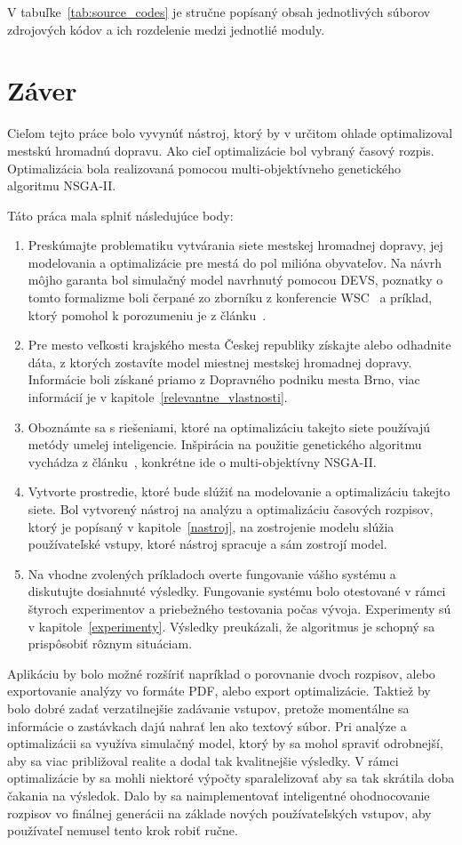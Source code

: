 V tabuľke~\ref{tab:source_codes} je stručne popísaný obsah jednotlivých súborov zdrojových kódov a ich rozdelenie medzi jednotlié moduly.

\chapter{Záver}\label{zaver}

Cieľom tejto práce bolo vyvynúť nástroj, ktorý by v určitom ohlade optimalizoval mestskú hromadnú dopravu.
Ako cieľ optimalizácie bol vybraný časový rozpis.
Optimalizácia bola realizovaná pomocou multi-objektívneho genetického algoritmu NSGA-II.

Táto práca mala splniť následujúce body:
\begin{enumerate}
  \item Preskúmajte problematiku vytvárania siete mestskej hromadnej dopravy, jej modelovania a optimalizácie pre mestá do pol milióna obyvateľov. Na návrh môjho garanta bol simulačný model navrhnutý pomocou DEVS, poznatky o tomto formalizme boli čerpané zo zborníku z konferencie WSC~\cite{tendeloo2018discrete} a príklad, ktorý pomohol k porozumeniu je z článku~\cite{seo2014devs}. 
  \item Pre mesto veľkosti krajského mesta Českej republiky získajte alebo odhadnite dáta, z ktorých zostavíte model miestnej mestskej hromadnej dopravy. Informácie boli získané priamo z Dopravného podniku mesta Brno, viac informácií je v kapitole~\ref{relevantne_vlastnosti}.
  \item Oboznámte sa s riešeniami, ktoré na optimalizáciu takejto siete používajú metódy umelej inteligencie. Inšpirácia na použitie genetického algoritmu vychádza z článku~\cite{tang2021data}, konkrétne ide o multi-objektívny NSGA-II.\@
  \item Vytvorte prostredie, ktoré bude slúžiť na modelovanie a optimalizáciu takejto siete. Bol vytvorený nástroj na analýzu a optimalizáciu časových rozpisov, ktorý je popísaný v kapitole~\ref{nastroj}, na zostrojenie modelu slúžia používateľské vstupy, ktoré nástroj spracuje a sám zostrojí model.
  \item Na vhodne zvolených príkladoch overte fungovanie vášho systému a diskutujte dosiahnuté výsledky. Fungovanie systému bolo otestované v rámci štyroch experimentov a priebežného testovania počas vývoja. Experimenty sú v kapitole~\ref{experimenty}. Výsledky preukázali, že algoritmus je schopný sa prispôsobiť rôznym situáciam.
\end{enumerate}

Aplikáciu by bolo možné rozšíriť napríklad o porovnanie dvoch rozpisov, alebo exportovanie analýzy vo formáte PDF, alebo export optimalizácie.
Taktiež by bolo dobré zadať verzatilnejšie zadávanie vstupov, pretože momentálne sa informácie o zastávkach dajú nahrať len ako textový súbor.
Pri analýze a optimalizácii sa využíva simulačný model, ktorý by sa mohol spraviť odrobnejší, aby sa viac približoval realite a dodal tak kvalitnejšie výsledky.
V rámci optimalizácie by sa mohli niektoré výpočty sparalelizovať aby sa tak skrátila doba čakania na výsledok.
Dalo by sa naimplementovať inteligentné ohodnocovanie rozpisov vo finálnej generácii na základe nových používateľských vstupov, aby používateľ nemusel tento krok robiť ručne.
